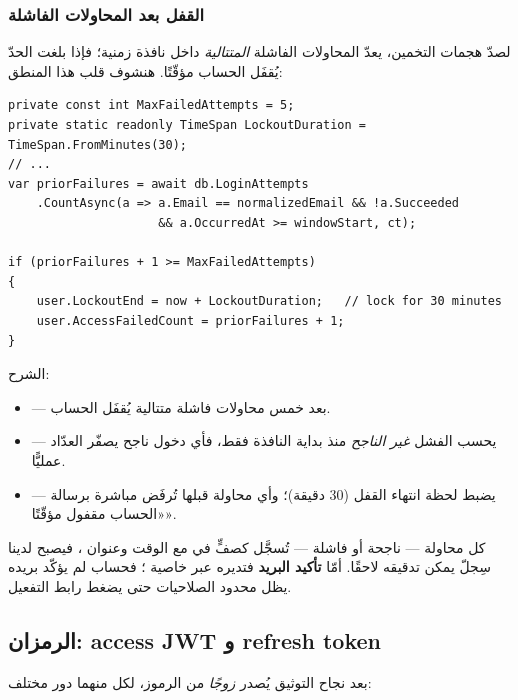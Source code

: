 \subsubsection{القفل بعد المحاولات الفاشلة}
لصدّ هجمات التخمين، يعدّ  المحاولات الفاشلة
\emph{المتتالية} داخل نافذة زمنية؛ فإذا بلغت الحدّ يُقفَل الحساب مؤقّتًا. هنشوف
قلب هذا المنطق:

\begin{english}
\begin{lstlisting}[language={[Sharp]C}]
private const int MaxFailedAttempts = 5;
private static readonly TimeSpan LockoutDuration = TimeSpan.FromMinutes(30);
// ...
var priorFailures = await db.LoginAttempts
    .CountAsync(a => a.Email == normalizedEmail && !a.Succeeded
                     && a.OccurredAt >= windowStart, ct);

if (priorFailures + 1 >= MaxFailedAttempts)
{
    user.LockoutEnd = now + LockoutDuration;   // lock for 30 minutes
    user.AccessFailedCount = priorFailures + 1;
}
\end{lstlisting}
\end{english}

الشرح:
\begin{itemize}
\item {} — بعد خمس محاولات فاشلة متتالية يُقفَل الحساب.
\item {} — يحسب الفشل \emph{غير الناجح} منذ بداية النافذة فقط،
  فأي دخول ناجح يصفّر العدّاد عمليًّا.
\item {} — يضبط لحظة انتهاء القفل (30 دقيقة)؛
  وأي محاولة قبلها تُرفَض مباشرة برسالة «الحساب مقفول مؤقّتًا».
\end{itemize}

كل محاولة — ناجحة أو فاشلة — تُسجَّل كصفٍّ في  مع الوقت وعنوان
، فيصبح لدينا سِجلّ يمكن تدقيقه لاحقًا. أمّا \textbf{تأكيد البريد} فتديره
 عبر خاصية ؛ فحساب لم يؤكّد بريده يظل محدود
الصلاحيات حتى يضغط رابط التفعيل.

\subsection{الرمزان: access JWT و refresh token}

بعد نجاح التوثيق يُصدر  \emph{زوجًا} من الرموز، لكل منهما دور مختلف:

